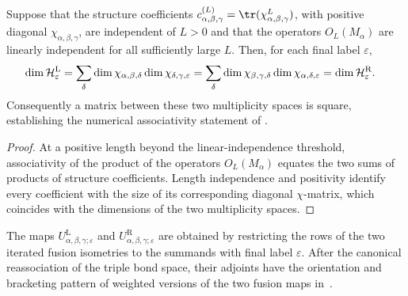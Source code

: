 \begin{lemma}%
    \label{thm:mpdo_final_sector_multiplicity_card_eq}
    \leanok
    Suppose that the structure coefficients
    $c_{\alpha,\beta,\gamma}^{(L)}
        =\tr(\chi_{\alpha,\beta,\gamma}^{L})$,
    with positive diagonal $\chi_{\alpha,\beta,\gamma}$, are independent of
    $L>0$ and that the operators $O_L(M_\alpha)$ are linearly independent
    for all sufficiently large $L$. Then, for each final label $\varepsilon$,
    \begin{align}
        \dim\mathcal H^{\mathrm L}_{\varepsilon}
         & =\sum_{\delta}
        \dim\chi_{\alpha,\beta,\delta}
        \dim\chi_{\delta,\gamma,\varepsilon}
        =\sum_{\delta}
        \dim\chi_{\beta,\gamma,\delta}
        \dim\chi_{\alpha,\delta,\varepsilon}
        =\dim\mathcal H^{\mathrm R}_{\varepsilon}.
        \notag
    \end{align}
    Consequently a matrix between these two multiplicity spaces is square,
    establishing the numerical associativity statement of
    \cite[lines~237--241]{Bultinck2017Anyons}.
\end{lemma}
\begin{proof}\leanok
    At a positive length beyond the linear-independence threshold,
    associativity of the product of the operators $O_L(M_\alpha)$ equates
    the two sums of products of structure coefficients.
    Length independence and positivity identify every coefficient with the
    size of its corresponding diagonal $\chi$-matrix, which coincides with the
    dimensions of the two multiplicity spaces.
\end{proof}

\begin{definition}%
    \label{def:mpdo_final_sector_fusion_maps}
    \leanok
    The maps $U^{\mathrm L}_{\alpha,\beta,\gamma;\varepsilon}$ and
    $U^{\mathrm R}_{\alpha,\beta,\gamma;\varepsilon}$ are obtained by
    restricting the rows of the two iterated fusion isometries to the
    summands with final label $\varepsilon$. After the canonical
    reassociation of the triple bond space, their adjoints have the
    orientation and bracketing pattern of weighted versions of the two
    fusion maps in~\cite[Section~3.4]{Bultinck2017Anyons}.
\end{definition}


